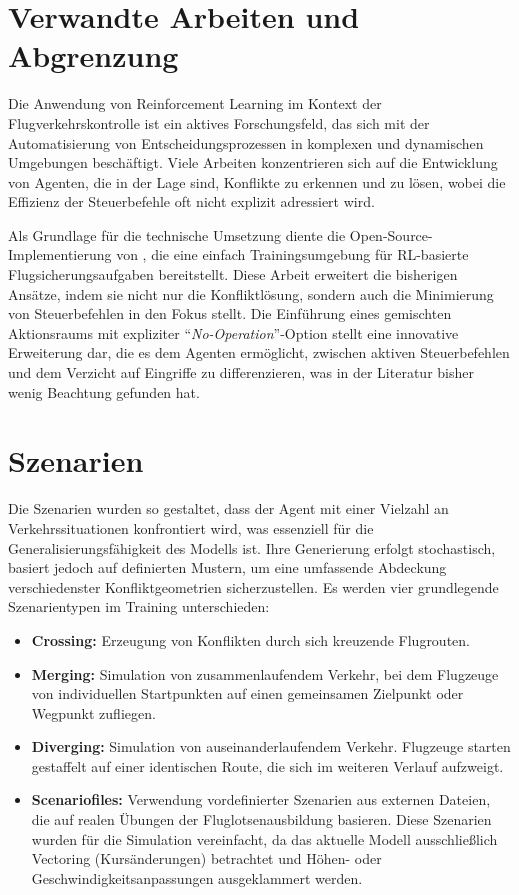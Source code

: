 \section{Verwandte Arbeiten und Abgrenzung}
Die Anwendung von Reinforcement Learning im Kontext der Flugverkehrskontrolle ist ein aktives Forschungsfeld, das sich mit der Automatisierung von Entscheidungsprozessen in komplexen und dynamischen Umgebungen beschäftigt.
Viele Arbeiten konzentrieren sich auf die Entwicklung von Agenten, die in der Lage sind, Konflikte zu erkennen und zu lösen, wobei die Effizienz der Steuerbefehle oft nicht explizit adressiert wird.
\medskip

Als Grundlage für die technische Umsetzung diente die Open\hyp{}Source\hyp{}Implementierung von \citet{bluesky-gym}, die eine einfach Trainingsumgebung
für \ac{RL}\hyp{}basierte Flugsicherungsaufgaben bereitstellt.
Diese Arbeit erweitert die bisherigen Ansätze, indem sie nicht nur die Konfliktlösung, sondern auch die Minimierung von Steuerbefehlen in den Fokus stellt. 
Die Einführung eines gemischten Aktionsraums mit expliziter \enquote{\emph{No-Operation}}-Option stellt eine innovative Erweiterung dar, die es dem Agenten ermöglicht, zwischen aktiven Steuerbefehlen und dem Verzicht auf Eingriffe zu differenzieren, was in der Literatur bisher wenig Beachtung gefunden hat.

\section{Szenarien}
Die Szenarien wurden so gestaltet, dass der Agent mit einer Vielzahl an Verkehrssituationen konfrontiert wird, was essenziell für die Generalisierungsfähigkeit des Modells ist. 
Ihre Generierung erfolgt stochastisch, basiert jedoch auf definierten Mustern, um eine umfassende Abdeckung verschiedenster Konfliktgeometrien sicherzustellen. 
Es werden vier grundlegende Szenarientypen im Training unterschieden:
\begin{itemize}
    \item \textbf{Crossing:} Erzeugung von Konflikten durch sich kreuzende Flugrouten.
    \item \textbf{Merging:} Simulation von zusammenlaufendem Verkehr, bei dem Flugzeuge von individuellen Startpunkten auf einen gemeinsamen Zielpunkt oder Wegpunkt zufliegen.
    \item \textbf{Diverging:} Simulation von auseinanderlaufendem Verkehr. Flugzeuge starten gestaffelt auf einer identischen Route, die sich im weiteren Verlauf aufzweigt.
    \item \textbf{Scenariofiles:} Verwendung vordefinierter Szenarien aus externen Dateien, die auf realen Übungen der Fluglotsenausbildung basieren. 
    Diese Szenarien wurden für die Simulation vereinfacht, da das aktuelle Modell ausschließlich Vectoring (Kursänderungen) betrachtet und Höhen\hyp{} oder Geschwindigkeitsanpassungen ausgeklammert werden.
\end{itemize}

